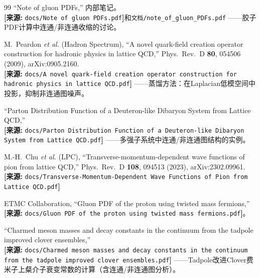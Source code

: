\documentclass[12pt,a4paper]{ctexart}
\theoremstyle{definition}
\begin{document}
\begin{thebibliography}{99}
``Note of gluon PDFs,'' 内部笔记。
\\\textbf{[来源:} \texttt{docs/Note of gluon PDFs.pdf}\textbf{]}和\texttt{文档/note\_of\_gluon\_PDFs.pdf}
——胶子PDF计算中连通/非连通收缩的讨论。

M.~Peardon \textit{et al.} (Hadron Spectrum),
``A novel quark-field creation operator construction for hadronic physics in lattice QCD,''
Phys.\ Rev.\ D \textbf{80}, 054506 (2009), arXiv:0905.2160.
\\\textbf{[来源:} \texttt{docs/A novel quark-field creation operator construction for hadronic physics in lattice QCD.pdf}\textbf{]}
——蒸馏方法：在Laplacian低模空间中投影，抑制非连通图噪声。

``Parton Distribution Function of a Deuteron-like Dibaryon System from Lattice QCD,''
\\\textbf{[来源:} \texttt{docs/Parton Distribution Function of a Deuteron-like Dibaryon System from Lattice QCD.pdf}\textbf{]}
——多强子系统中连通/非连通图结构的实例。

M.-H.~Chu \textit{et al.} (LPC),
``Transverse-momentum-dependent wave functions of pion from lattice QCD,''
Phys.\ Rev.\ D \textbf{108}, 094513 (2023), arXiv:2302.09961.
\\\textbf{[来源:} \texttt{docs/Transverse-Momentum-Dependent Wave Functions of Pion from Lattice QCD.pdf}\textbf{]}

ETMC Collaboration,
``Gluon PDF of the proton using twisted mass fermions,''
\\\textbf{[来源:} \texttt{docs/Gluon PDF of the proton using twisted mass fermions.pdf}\textbf{]}。

``Charmed meson masses and decay constants in the continuum from the tadpole improved clover ensembles,''
\\\textbf{[来源:} \texttt{docs/Charmed meson masses and decay constants in the continuum from the tadpole improved clover ensembles.pdf}\textbf{]}
——Tadpole改进Clover费米子上粲介子衰变常数的计算（含连通/非连通图分析）。

\end{thebibliography}
\end{document}
